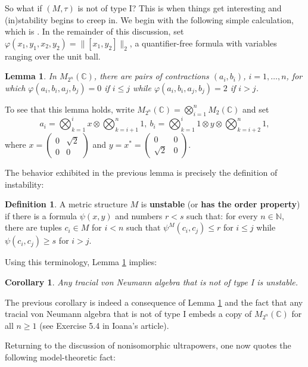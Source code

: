 \documentclass[12pt]{amsart}
\newtheorem{lem}[thm]{Lemma}
\newtheorem{cor}[thm]{Corollary}
\theoremstyle{definition}
\newtheorem{defn}[thm]{Definition}
\def\bb{\mathbb}
\def\bb{\mathbb}
\begin{document}
So what if $(M,\tau)$ is not of type I?  This is when things get interesting and (in)stability begins to creep in.  We begin with the following simple calculation, which is \cite[Lemma 3.2(1)]{mtoa1}.  In the remainder of this discussion, set $\varphi(x_1,y_1,x_2,y_2)=\|[x_1,y_2]\|_2$, a quantifier-free formula with variables ranging over the unit ball.  

\begin{lem}\label{unstablelemma}
In $M_{2^n}(\bb C)$, there are pairs of contractions $(a_i,b_i)$, $i=1,\ldots,n$, for which $\varphi(a_i,b_i,a_j,b_j)=0$ if $i\leq j$ while $\varphi(a_i,b_i,a_j,b_j)=2$ if $i>j$.
\end{lem}

To see that this lemma holds, write $M_{2^n}(\bb C)=\bigotimes_{i=1}^n M_2(\bb C)$ and set $$a_i=\bigotimes_{k=1}^ix\otimes \bigotimes_{k=i+1}^{n}1, \ b_i=\bigotimes_{k=1}^i1\otimes y\otimes \bigotimes_{k=i+2}^{n}1,$$ where $x=\left(\begin{matrix}0 & \sqrt{2}\\0 & 0\end{matrix}\right)$ and $y=x^*=\left(\begin{matrix}0 & 0\\ \sqrt{2} & 0\end{matrix}\right)$.

The behavior exhibited in the previous lemma is precisely the definition of instability:

\begin{defn}\label{unstabledef}
A metric structure $M$ is \textbf{unstable} (or \textbf{has the order property}) if there is a formula $\psi(x,y)$ and numbers $r < s$ such that: for every $n\in \bb N$, there are tuples $c_i \in M$ for $i < n$ such that $\psi^M(c_i,c_j) \leq r$ for $i\leq j$ while $\psi(c_i,c_j) \geq s$ for $i> j$.
\end{defn}

Using this terminology, Lemma \ref{unstablelemma} implies:

\begin{cor}\label{unstablevna}
Any tracial von Neumann algebra that is not of type I is unstable.
\end{cor}

The previous corollary is indeed a consequence of Lemma \ref{unstablelemma} and the fact that any tracial von Neumann algebra that is not of type I embeds a copy of $M_{2^n}(\bb C)$ for all $n\geq 1$ (see Exercise 5.4 in Ioana's article).  

Returning to the discussion of nonisomorphic ultrapowers, one now quotes the following model-theoretic fact:
\end{document}
